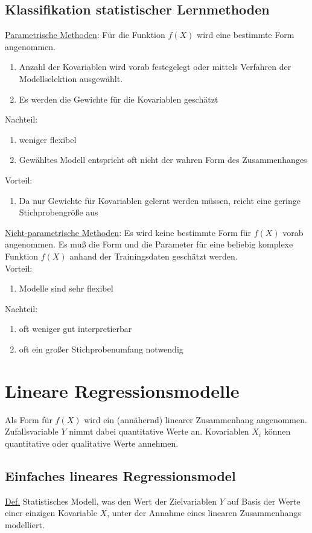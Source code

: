 \subsection{Klassifikation statistischer Lernmethoden}
\underline{Parametrische Methoden}: Für die Funktion $f(X)$ wird eine bestimmte Form angenommen.
\begin{enumerate}
	\item Anzahl der Kovariablen wird vorab festegelegt oder mittels Verfahren der Modellselektion ausgewählt.
	\item Es werden die Gewichte für die Kovariablen geschätzt
\end{enumerate}
Nachteil: 
\begin{enumerate}
	\item weniger flexibel
	\item Gewähltes Modell entspricht oft nicht der wahren Form des Zusammenhanges
\end{enumerate}
Vorteil:
\begin{enumerate}
	\item Da nur Gewichte für Kovariablen gelernt werden müssen, reicht eine geringe Stichprobengröße aus
\end{enumerate}

\underline{Nicht-parametrische Methoden}: Es wird keine bestimmte Form für $f(X)$ vorab angenommen.
Es muß die Form und die Parameter für eine beliebig komplexe Funktion $f(X)$ anhand der Trainingsdaten geschätzt werden. \\
Vorteil:
\begin{enumerate}
	\item Modelle sind sehr flexibel
\end{enumerate}

Nachteil:
\begin{enumerate}
	\item oft weniger gut interpretierbar
	\item oft ein großer Stichprobenumfang notwendig
\end{enumerate}

\section{Lineare Regressionsmodelle}
Als Form für $f(X)$ wird ein (annähernd) linearer Zusammenhang angenommen. Zufallsvariable $Y$ nimmt dabei quantitative Werte an. 
Kovariablen $X_i$ können quantitative oder qualitative Werte annehmen.

\subsection{Einfaches lineares Regressionsmodel}
\underline{Def.} Statistisches Modell, was den Wert der Zielvariablen $Y$ auf Basis der Werte einer einzigen Kovariable $X$, unter der Annahme eines linearen Zusammenhangs modelliert.


